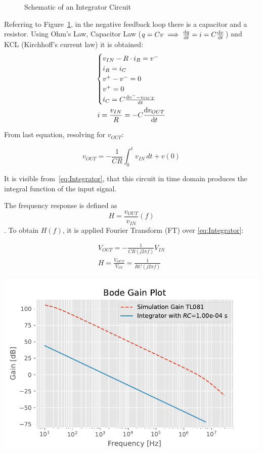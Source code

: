 \documentclass[a4paper, twocolumn]{article}
\begin{document}
\begin{figure}
    \centering
    \def\svgwidht{\columnwidth}
    
    \caption{Schematic of an Integrator Circuit}
    \label{fig:IntegrScheme}
\end{figure}

Referring to Figure~\ref{fig:IntegrScheme}, in the negative feedback loop there is a capacitor and a resistor.
Using Ohm's Law, Capacitor Law ($ q = Cv \implies \dv {q}{t}=i=C\dv{v}{t} $) and KCL (Kirchhoff's current law) it is obtained:
\begin{gather*}
    \begin{cases}
        v_{IN} - R\cdot i_R = v^-\\
        i_R=i_C\\
        v^+-v^-=0\\
        v^+=0\\
        i_C=C\dv{v^--v_{OUT}}{t}
    \end{cases}\\
    i = \frac{v_{IN}}{R}=-C\dv{v_{OUT}}{t}\\
\end{gather*}

From last equation, resolving for $v_{OUT}$:

\begin{equation}
    \label{eq:Integrator}
    v_{OUT}=-\frac{1}{CR}\int_0^t{v_{IN}}\,dt + v(0)
\end{equation}

It is visible from~\eqref{eq:Integrator}, that this circuit in time domain produces the integral function of the input signal.

The frequency response is defined as \[H=\frac{v_{OUT}}{v_{IN}}(f)\].
To obtain $H(f)$, it is applied Fourier Transform (FT) over \eqref{eq:Integrator}:

\begin{gather}
    V_{OUT}=-\frac{1}{CR(j2\pi f)}V_{IN}\\
    H = \frac{V_{OUT}}{V_{IN}} = \frac{1}{RC(j2\pi f)}   
\end{gather}

\begin{center}
    \includegraphics[width=\columnwidth]{def_graph/IntegratorBodeTheo.pdf}
    \label{fig:IntBodeGraphTheo}
\end{center}
\end{document}
